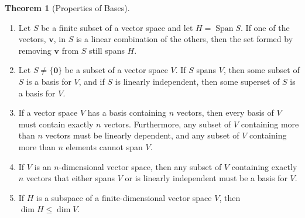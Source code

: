 \documentclass{myart}
\renewcommand{\vec}[1]{\ensuremath{\mathbf{#1}}}
\DeclareMathOperator{\OpSpan}{Span}
\newcommand{\set}[1]{\ensuremath{\{#1\}}}
\theoremstyle{definition}
\newtheorem{thm}{Theorem}
\begin{document}
\begin{thm}[Properties of Bases] \hfill
  \begin{enumerate}
  \item Let $S$ be a finite subset of a vector space and let $H =
    \OpSpan S$. If one of the vectors, \vec v, in $S$ is a linear
    combination of the others, then the set formed by removing \vec v
    from $S$ still spans $H$.
  \item Let $S \neq \set{\vec 0}$ be a subset of a vector space $V$.
    If $S$ spans $V$, then some subset of $S$ is a basis for $V$, and
    if $S$ is linearly independent, then some superset of $S$ is a
    basis for $V$.
  \item If a vector space $V$ has a basis containing $n$ vectors, then
    every basis of $V$ must contain exactly $n$ vectors. Furthermore,
    any subset of $V$ containing more than $n$ vectors must be
    linearly dependent, and any subset of $V$ containing more than $n$
    elements cannot span $V$.
  \item If $V$ is an $n$-dimensional vector space, then any subset of
    $V$ containing exactly $n$ vectors that either spans $V$ or is
    linearly independent must be a basis for $V$.
  \item If $H$ is a subspace of a finite-dimensional vector space $V$,
    then $\dim H \leq \dim V$.
  \end{enumerate}
\end{thm}
\end{document}
